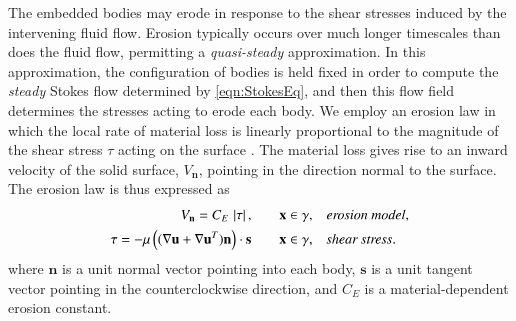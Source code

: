 \documentclass[3p]{elsarticle}
\newcommand{\nn}{{\mathbf{n}}}
\renewcommand{\ss}{{\mathbf{s}}}
\newcommand{\uu}{{\mathbf{u}}}
\newcommand{\UU}{{\mathbf{U}}}
\newcommand{\xx}{{\mathbf{x}}}
\newcommand{\abs}[1]{\left| #1 \right|}
\newcommand{\Vn}{V_\nn}
\newcommand{\CE}{C_E}
\begin{document}
The embedded bodies may erode in response to the shear stresses induced by the intervening fluid flow. Erosion typically occurs over much longer timescales than does the fluid flow, permitting a {\em quasi-steady} approximation. In this approximation, the configuration of bodies is held fixed in order to compute the {\em steady} Stokes flow determined by \eqref{eqn:StokesEq}, and then this flow field determines the stresses acting to erode each body. We employ an erosion law in which the local rate of material loss is linearly proportional to the magnitude of the shear stress $\tau$ acting on the surface \cite{Ristroph2012, Moore2013, Mitchell2016, MooreCPAM2017, HewettJFS2017, quaife2018boundary, chiu2020viscous}. The material loss gives rise to an inward velocity of the solid surface, $\Vn$, pointing in the direction normal to the surface. The erosion law is thus expressed as
\begin{align}
\Vn = \CE \, \abs{\tau}, 
	&\hspace{20pt} \xx \in \gamma, &&\mbox{\em erosion model}, 
\label{Vn0} \\
\tau = -\mu \left( ( \nabla \uu + \nabla \uu^T) \nn \right) \cdot \ss
	&\hspace{20pt} \xx \in \gamma, &&\mbox{\em shear stress}.
\label{tau0}
\end{align}
where $\nn$ is a unit normal vector pointing into each body, $\ss$ is
a unit tangent vector pointing in the counterclockwise direction, and $\CE$ is a material-dependent erosion constant.




\end{document}
